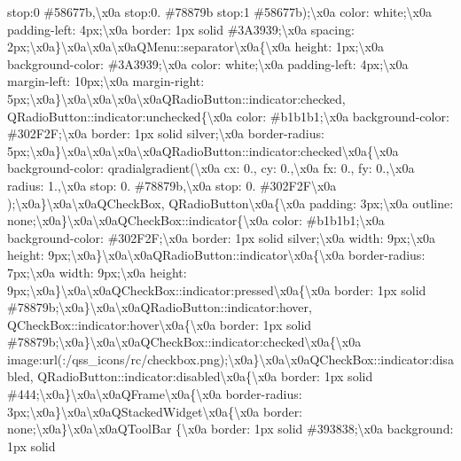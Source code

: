 stop\+:0 \#58677b,\textbackslash{}x0a stop\+:0. \#78879b stop\+:1 \#58677b);\textbackslash{}x0a color\+: white;\textbackslash{}x0a padding-\/left\+: 4px;\textbackslash{}x0a border\+: 1px solid \#3\+A3939;\textbackslash{}x0a spacing\+: 2px;\textbackslash{}x0a\}\textbackslash{}x0a\textbackslash{}x0a\textbackslash{}x0a\+Q\+Menu\+::separator\textbackslash{}x0a\{\textbackslash{}x0a height\+: 1px;\textbackslash{}x0a background-\/color\+: \#3\+A3939;\textbackslash{}x0a color\+: white;\textbackslash{}x0a padding-\/left\+: 4px;\textbackslash{}x0a margin-\/left\+: 10px;\textbackslash{}x0a margin-\/right\+: 5px;\textbackslash{}x0a\}\textbackslash{}x0a\textbackslash{}x0a\textbackslash{}x0a\textbackslash{}x0a\+Q\+Radio\+Button\+::indicator\+:checked, Q\+Radio\+Button\+::indicator\+:unchecked\{\textbackslash{}x0a color\+: \#b1b1b1;\textbackslash{}x0a background-\/color\+: \#302\+F2\+F;\textbackslash{}x0a border\+: 1px solid silver;\textbackslash{}x0a border-\/radius\+: 5px;\textbackslash{}x0a\}\textbackslash{}x0a\textbackslash{}x0a\textbackslash{}x0a\textbackslash{}x0a\+Q\+Radio\+Button\+::indicator\+:checked\textbackslash{}x0a\{\textbackslash{}x0a background-\/color\+: qradialgradient(\textbackslash{}x0a cx\+: 0., cy\+: 0.,\textbackslash{}x0a fx\+: 0., fy\+: 0.,\textbackslash{}x0a radius\+: 1.,\textbackslash{}x0a stop\+: 0. \#78879b,\textbackslash{}x0a stop\+: 0. \#302\+F2\+F\textbackslash{}x0a );\textbackslash{}x0a\}\textbackslash{}x0a\textbackslash{}x0a\+Q\+Check\+Box, Q\+Radio\+Button\textbackslash{}x0a\{\textbackslash{}x0a padding\+: 3px;\textbackslash{}x0a outline\+: none;\textbackslash{}x0a\}\textbackslash{}x0a\textbackslash{}x0a\+Q\+Check\+Box\+::indicator\{\textbackslash{}x0a color\+: \#b1b1b1;\textbackslash{}x0a background-\/color\+: \#302\+F2\+F;\textbackslash{}x0a border\+: 1px solid silver;\textbackslash{}x0a width\+: 9px;\textbackslash{}x0a height\+: 9px;\textbackslash{}x0a\}\textbackslash{}x0a\textbackslash{}x0a\+Q\+Radio\+Button\+::indicator\textbackslash{}x0a\{\textbackslash{}x0a border-\/radius\+: 7px;\textbackslash{}x0a width\+: 9px;\textbackslash{}x0a height\+: 9px;\textbackslash{}x0a\}\textbackslash{}x0a\textbackslash{}x0a\+Q\+Check\+Box\+::indicator\+:pressed\textbackslash{}x0a\{\textbackslash{}x0a border\+: 1px solid \#78879b;\textbackslash{}x0a\}\textbackslash{}x0a\textbackslash{}x0a\+Q\+Radio\+Button\+::indicator\+:hover, Q\+Check\+Box\+::indicator\+:hover\textbackslash{}x0a\{\textbackslash{}x0a border\+: 1px solid \#78879b;\textbackslash{}x0a\}\textbackslash{}x0a\textbackslash{}x0a\+Q\+Check\+Box\+::indicator\+:checked\textbackslash{}x0a\{\textbackslash{}x0a image\+:url(\+:/qss\+\_\+icons/rc/checkbox.\+png);\textbackslash{}x0a\}\textbackslash{}x0a\textbackslash{}x0a\+Q\+Check\+Box\+::indicator\+:disabled, Q\+Radio\+Button\+::indicator\+:disabled\textbackslash{}x0a\{\textbackslash{}x0a border\+: 1px solid \#444;\textbackslash{}x0a\}\textbackslash{}x0a\textbackslash{}x0a\+Q\+Frame\textbackslash{}x0a\{\textbackslash{}x0a border-\/radius\+: 3px;\textbackslash{}x0a\}\textbackslash{}x0a\textbackslash{}x0a\+Q\+Stacked\+Widget\textbackslash{}x0a\{\textbackslash{}x0a border\+: none;\textbackslash{}x0a\}\textbackslash{}x0a\textbackslash{}x0a\+Q\+Tool\+Bar \{\textbackslash{}x0a border\+: 1px solid \#393838;\textbackslash{}x0a background\+: 1px solid 